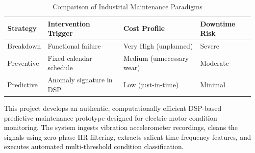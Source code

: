 \documentclass[conference,a4paper]{IEEEtran}
\begin{document}
\begin{table}[htbp]
\centering
\caption{Comparison of Industrial Maintenance Paradigms}
\begin{tabular}{@{}llll@{}}
\toprule
\textbf{Strategy} & \textbf{Intervention Trigger} & \textbf{Cost Profile} & \textbf{Downtime Risk} \\
\midrule
Breakdown   & Functional failure        & Very High (unplanned) & Severe \\
Preventive  & Fixed calendar schedule   & Medium (unnecessary wear) & Moderate \\
Predictive  & Anomaly signature in DSP  & Low (just-in-time)    & Minimal \\
\bottomrule
\end{tabular}
\label{tab:maint_comparison}
\end{table}

This project develops an authentic, computationally efficient DSP-based predictive maintenance prototype designed for electric motor condition monitoring. The system ingests vibration accelerometer recordings, cleans the signals using zero-phase IIR filtering, extracts salient time-frequency features, and executes automated multi-threshold condition classification.

\end{document}
